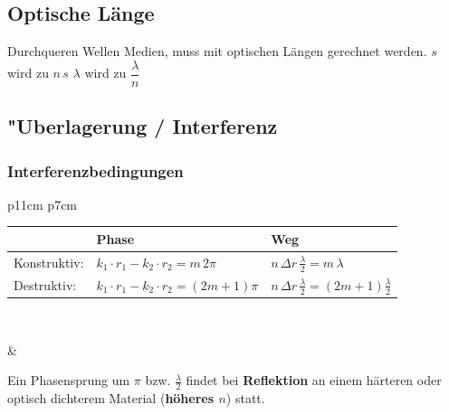 \subsection{Optische Länge}
Durchqueren Wellen Medien, muss mit optischen Längen gerechnet werden.\qquad 
$s$ wird zu $n\,s$ \qquad $\lambda$ wird zu $\dfrac{\lambda}{n}$



\subsection{"Uberlagerung / Interferenz  }
\setlength{\tabcolsep}{5pt}
\renewcommand{\arraystretch}{2}
\subsubsection{Interferenzbedingungen}
\begin{tabular}{p{11cm} p{7cm}}
\begin{minipage}[]{11cm}
	\begin{tabular}{|l|l|l|}
	\hline
	& \textbf{Phase} & \textbf{Weg} \\
	\hline
	Konstruktiv: 
		& $k_1\cdot r_1-k_2\cdot r_2=m \, 2\pi$
		& $n \, \Delta r \, \frac{\lambda}{2} = m \, \lambda$ \\
	Destruktiv: 
	 	& $k_1\cdot r_1-k_2\cdot r_2=(2m+1)\pi$
	 	& $n \, \Delta r \, \frac{\lambda}{2} = (2m+1) \frac{\lambda}{2}$ \\
	\hline
	\end{tabular}\\
	\end{minipage}

	& \parbox{7cm}{
		Ein Phasensprung um $\pi$ bzw. $\frac{\lambda}{2}$ findet bei
		\textbf{Reflektion} an einem härteren oder optisch dichterem Material
		(\textbf{höheres $n$}) statt.
	}
\end{tabular}
\newpage


